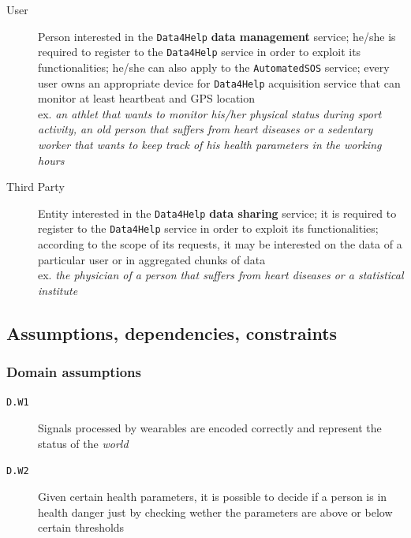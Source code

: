 \documentclass[12pt]{article}
\begin{document}
      \begin{description}
        \item [User] Person interested in the \texttt{Data4Help} \textbf{data management} service; he/she is required to register to the \texttt{Data4Help} service in order to exploit its functionalities; he/she can also apply to the \texttt{AutomatedSOS} service; every user owns an appropriate device for \texttt{Data4Help} acquisition service that can monitor at least heartbeat and GPS location \\
        ex. \textit{an athlet that wants to monitor his/her physical status during sport activity, an old person that suffers from heart diseases or a sedentary worker that wants to keep track of his health parameters in the working hours}
        \item [Third Party] Entity interested in the \texttt{Data4Help} \textbf{data sharing} service; it is required to register to the \texttt{Data4Help} service in order to exploit its functionalities; according to the scope of its requests, it may be interested on the data of a particular user or in aggregated chunks of data \\
        ex. \textit{the physician of a person that suffers from heart diseases or a statistical institute}
      \end{description}

  \subsection{Assumptions, dependencies, constraints}

    \subsubsection{Domain assumptions}

      \begin{description}
        \item[\texttt{D.W1}] Signals processed by wearables are encoded correctly and represent the status of the \textit{world}
        \item[\texttt{D.W2}] Given certain health parameters, it is possible to decide if a person is in health danger just by checking wether the parameters are above or below certain thresholds
      \end{description}
\end{document}
